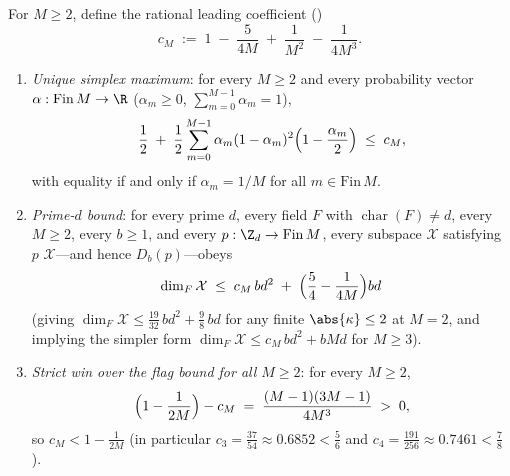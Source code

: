 \begin{theorem}\label{thm:1b-multi-class}
For $M \ge 2$, define the rational leading coefficient ()
\[
  c_M \;:=\; 1 \;-\; \frac{5}{4M} \;+\; \frac{1}{M^2} \;-\; \frac{1}{4M^3}.
\]
\begin{enumerate}[label=(\alph*)]
\item \emph{Unique simplex maximum}: for every $M \ge 2$ and every probability vector
  $\alpha : \mathrm{Fin}\,M \to \R$ ($\alpha_m \ge 0$, $\sum_{m=0}^{M-1} \alpha_m = 1$),
  \[
    \frac{1}{2} \;+\; \frac{1}{2}\sum_{m=0}^{M-1} \alpha_m(1 - \alpha_m)^2\Bigl(1 - \frac{\alpha_m}{2}\Bigr)
    \;\le\;
    c_M,
  \]
  with equality if and only if $\alpha_m = 1/M$ for all $m \in \mathrm{Fin}\,M$.
\item \emph{Prime-$d$ bound}: for every prime $d$, every field $F$ with $\operatorname{char}(F) \ne d$,
  every $M \ge 2$, every $b \ge 1$, and every $p : \Z_d \to \mathrm{Fin}\,M$, every subspace
  $\mathcal{X}$ satisfying  $p$ $\mathcal{X}$---and hence
  $D_b(p)$---obeys
  \[
    \dim_F \mathcal{X}
    \;\le\;
    c_M\,b d^2 \;+\; \Bigl(\frac{5}{4} - \frac{1}{4M}\Bigr) b d
  \]
  (giving $\dim_F \mathcal{X} \le \frac{19}{32}\,b d^2 + \frac{9}{8}\,b d$ for any finite
  $\abs{\kappa} \le 2$ at $M = 2$, and implying the simpler form
  $\dim_F \mathcal{X} \le c_M\,b d^2 + b M d$ for $M \ge 3$).
\item \emph{Strict win over the flag bound for all $M \ge 2$}: for every $M \ge 2$,
  \[
    \Bigl(1 - \frac{1}{2M}\Bigr) - c_M \;=\; \frac{(M - 1)(3M - 1)}{4M^3} \;>\; 0,
  \]
  so $c_M < 1 - \frac{1}{2M}$ (in particular $c_3 = \frac{37}{54} \approx 0.6852 < \frac{5}{6}$ and
  $c_4 = \frac{191}{256} \approx 0.7461 < \frac{7}{8}$).
\end{enumerate}
\end{theorem}
